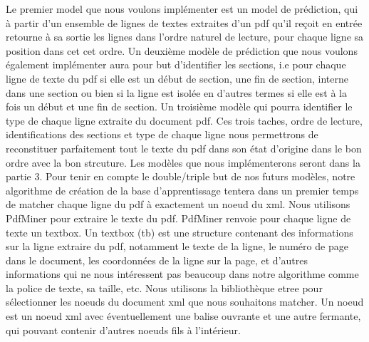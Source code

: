 \documentclass{report}
\begin{document}
\begin{multicols}{2}
    \hspace{.1em} Le premier model que nous voulons implémenter est un model de prédiction, qui à partir d’un ensemble de lignes de textes extraites d’un pdf qu’il reçoit en entrée retourne à sa sortie les lignes dans l’ordre naturel de lecture, pour chaque ligne sa position dans cet cet ordre.
    \hspace{.1em} Un deuxième modèle de prédiction que nous voulons également implémenter aura pour but d’identifier les sections, i.e pour chaque ligne de texte du pdf si elle est un début de section, une fin de section, interne dans une section ou bien si la ligne est isolée en d’autres termes si elle est à la fois un début et une fin de section.
    \hspace{.1em} Un troisième modèle qui pourra identifier le type de chaque ligne extraite du document pdf.
    \hspace{.1em} Ces trois taches, ordre de lecture, identifications des sections et type de chaque ligne nous permettrons de reconstituer parfaitement tout le texte du pdf dans son état d’origine dans le bon ordre avec la bon strcuture. 
    \hspace{.1em} Les modèles que nous implémenterons seront dans la partie 3.
    \hspace{.1em} Pour tenir en compte le double/triple but de nos futurs modèles, notre algorithme de création de la base d’apprentissage tentera dans un premier temps de matcher chaque ligne du pdf à exactement un noeud du xml. 
    \hspace{.1em} Nous utilisons PdfMiner pour extraire le texte du pdf. PdfMiner renvoie pour chaque ligne de texte un textbox. Un textbox (tb) est une structure contenant des informations sur la ligne extraire du pdf, notamment le texte de la ligne, le numéro de page dans le document, les coordonnées de la ligne sur la page, et d’autres informations qui ne nous intéressent pas beaucoup dans notre algorithme comme la police de texte, sa taille, etc.
    \hspace{.1em} Nous utilisons la bibliothèque etree pour sélectionner les noeuds du document xml que nous souhaitons matcher. Un noeud est un noeud xml avec éventuellement une balise ouvrante et une autre fermante, qui pouvant contenir d’autres noeuds fils à l’intérieur.

\end{multicols}
\end{document}
